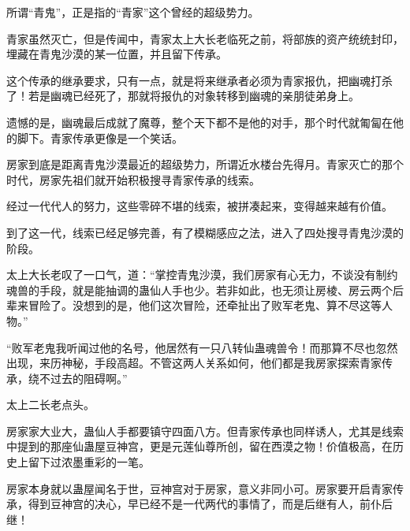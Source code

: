 \begin{this_body}
所谓“青鬼”，正是指的“青家”这个曾经的超级势力。

青家虽然灭亡，但是传闻中，青家太上大长老临死之前，将部族的资产统统封印，埋藏在青鬼沙漠的某一位置，并且留下传承。

这个传承的继承要求，只有一点，就是将来继承者必须为青家报仇，把幽魂打杀了！若是幽魂已经死了，那就将报仇的对象转移到幽魂的亲朋徒弟身上。

遗憾的是，幽魂最后成就了魔尊，整个天下都不是他的对手，那个时代就匍匐在他的脚下。青家传承更像是一个笑话。

房家到底是距离青鬼沙漠最近的超级势力，所谓近水楼台先得月。青家灭亡的那个时代，房家先祖们就开始积极搜寻青家传承的线索。

经过一代代人的努力，这些零碎不堪的线索，被拼凑起来，变得越来越有价值。

到了这一代，线索已经足够完善，有了模糊感应之法，进入了四处搜寻青鬼沙漠的阶段。

太上大长老叹了一口气，道：“掌控青鬼沙漠，我们房家有心无力，不谈没有制约魂兽的手段，就是能抽调的蛊仙人手也少。若非如此，也无须让房棱、房云两个后辈来冒险了。没想到的是，他们这次冒险，还牵扯出了败军老鬼、算不尽这等人物。”

“败军老鬼我听闻过他的名号，他居然有一只八转仙蛊魂兽令！而那算不尽也忽然出现，来历神秘，手段高超。不管这两人关系如何，他们都是我房家探索青家传承，绕不过去的阻碍啊。”

太上二长老点头。

房家家大业大，蛊仙人手都要镇守四面八方。但青家传承也同样诱人，尤其是线索中提到的那座仙蛊屋豆神宫，更是元莲仙尊所创，留在西漠之物！价值极高，在历史上留下过浓墨重彩的一笔。

房家本身就以蛊屋闻名于世，豆神宫对于房家，意义非同小可。房家要开启青家传承，得到豆神宫的决心，早已经不是一代两代的事情了，而是后继有人，前仆后继！

\end{this_body}

